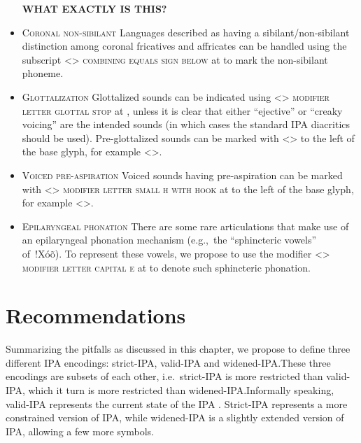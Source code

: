 \begin{itemize}
      \textbf{WHAT EXACTLY IS THIS?}
\item \textsc{Coronal non-sibilant} \newline
      Languages described as having a sibilant/non-sibilant distinction among
      coronal fricatives and affricates can be handled using the subscript
      <> \textsc{combining equals sign below} at  to mark
      the non-sibilant phoneme.
\item \textsc{Glottalization} \newline 
      Glottalized sounds can be indicated using
      <> \textsc{modifier letter glottal stop} at , unless
      it is clear that either ``ejective'' or ``creaky voicing'' are the
      intended sounds (in which cases the standard IPA diacritics should be
      used). Pre-glottalized sounds can be marked with
      <> to the left of the base
      glyph, for example <>.
\item \textsc{Voiced pre-aspiration} \newline Voiced sounds having
      pre-aspiration can be marked with
      <> \textsc{modifier letter
      small h with hook} at  to the left of the base glyph, for
      example <>.
\item \textsc{Epilaryngeal phonation} \newline 
      There are some rare articulations that make
      use of an epilaryngeal phonation mechanism (e.g.,~the “sphincteric vowels”
      of~!Xóõ). To represent these vowels, we propose to use the modifier <>
      \textsc{modifier letter capital e} at  to denote such sphincteric
      phonation.

\end{itemize}




\section{Recommendations}
\label{ipa-recommendations}


Summarizing the pitfalls as discussed in this chapter, we propose to define 
three different IPA encodings: strict-IPA, valid-IPA and widened-IPA.\@ These 
three encodings are subsets of each other, i.e.~strict-IPA is more restricted 
than valid-IPA, which it turn is more restricted than widened-IPA.\@ Informally 
speaking, valid-IPA represents the current state of the IPA \citep{IPA2005}. 
Strict-IPA represents a more constrained version of IPA, while widened-IPA is a 
slightly extended version of IPA, allowing a few more symbols.

